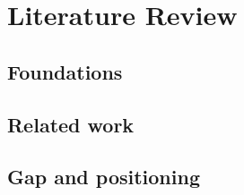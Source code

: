 \chapter{Literature Review}
\label{ch:literature-review}


\section{Foundations}
\label{sec:lit-foundations}

\section{Related work}
\label{sec:lit-related}

\section{Gap and positioning}
\label{sec:lit-gap}

